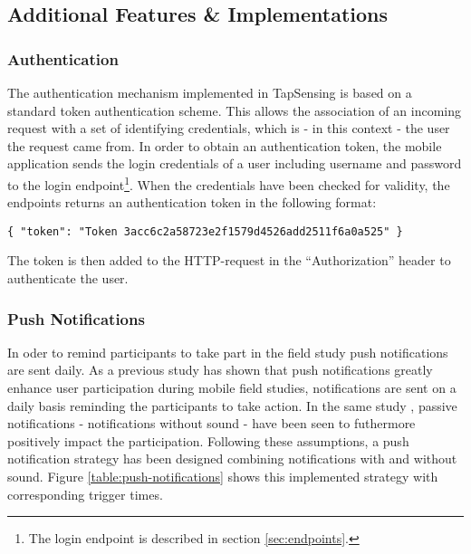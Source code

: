 \subsection{Additional Features \& Implementations}
\subsubsection{Authentication}
The authentication mechanism implemented in TapSensing is based on a standard token authentication scheme. This allows the association of an incoming request with a set of identifying credentials, which is - in this context - the user the request came from. In order to obtain an authentication token, the mobile application sends the login credentials of a user including username and password to the login endpoint\footnote{The login endpoint is described in section \ref{sec:endpoints}.}. When the credentials have been checked for validity, the endpoints returns an authentication token in the following format:
\begin{verbatim}
{ "token": "Token 3acc6c2a58723e2f1579d4526add2511f6a0a525" }
\end{verbatim}
The token is then added to the HTTP-request in the ``Authorization'' header to authenticate the user.

\subsubsection{Push Notifications}
In oder to remind participants to take part in the field study push notifications are sent daily. As a previous study has shown that push notifications greatly enhance user participation \cite{pushNot} during mobile field studies, notifications are sent on a daily basis reminding the participants to take action. In the same study \cite{pushNot}, passive notifications - notifications without sound - have been seen to futhermore positively impact the participation. 
Following these assumptions, a push notification strategy has been designed combining notifications with and without sound. Figure \ref{table:push-notifications} shows this implemented strategy with corresponding trigger times.

